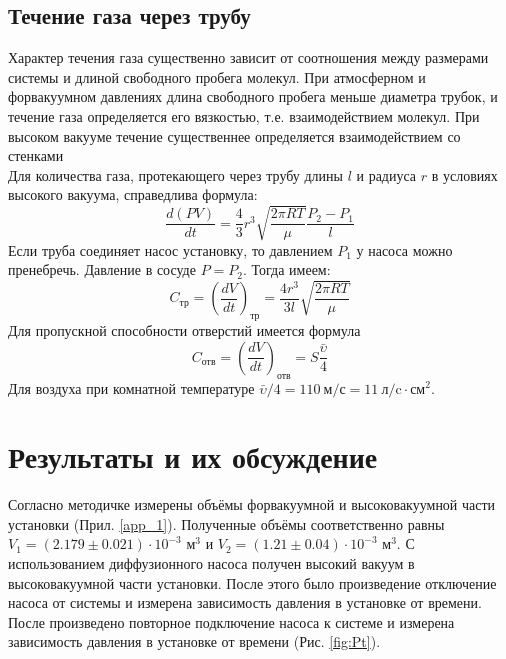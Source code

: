 \documentclass[12pt]{article}
\begin{document}
\subsection*{Течение газа через трубу}
Характер течения газа существенно зависит от соотношения между размерами системы и длиной свободного пробега молекул. При атмосферном и форвакуумном давлениях  длина свободного пробега меньше диаметра трубок, и течение газа определяется его вязкостью, т.е. взаимодействием молекул. При высоком вакууме течение существеннее определяется взаимодействием со стенками \\
Для количества газа, протекающего через трубу длины $l$ и радиуса $r$ в условиях высокого вакуума, справедлива формула:
\begin{equation}
	\frac{d(PV)}{dt} = \frac{4}{3}r^3\sqrt{\frac{2\pi RT}{\mu}}\frac{P_2 - P_1}{l}
\end{equation}
Если труба соединяет насос установку, то давлением $P_1$ у насоса можно пренебречь. Давление в сосуде $P = P_2$. Тогда имеем:
\begin{equation}
C_\text{тр} = \left(\frac{dV}{dt}\right)_\text{тр} = \frac{4r^3}{3l}\sqrt{\frac{2\pi RT}{\mu}}
\end{equation}
Для пропускной способности отверстий имеется формула
\begin{equation}
C_\text{отв} = \left(\frac{dV}{dt}\right)_\text{отв} = S\frac{\bar{\upsilon}}{4}
\end{equation}
Для воздуха при комнатной температуре $\bar{\upsilon}/4 = 110~\text{м/с} = 11~\text{л/c}\cdot\text{см}^2$.


\section{Результаты и их обсуждение}
Согласно методичке измерены объёмы форвакуумной и высоковакуумной части установки (Прил. \ref{app_1}). Полученные объёмы соответственно 
равны $V_1 = (2.179 \pm 0.021) \cdot 10 ^ {-3}$ $\text{м}^3$ и $V_2 = (1.21 \pm 0.04) \cdot 10 ^ {-3}$ $\text{м}^3$. С использованием диффузионного насоса 
получен высокий вакуум в высоковакуумной части установки. После этого было произведение отключение насоса от системы 
и измерена зависимость давления в установке от времени. После произведено повторное подключение насоса к системе 
и измерена зависимость давления в установке от времени (Рис. \ref{fig:Pt}). 
\end{document}
